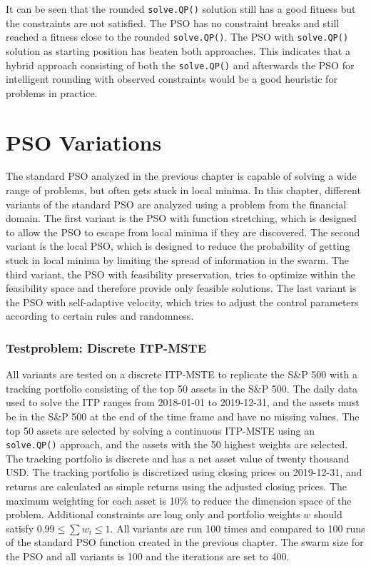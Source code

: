 \documentclass[
  oneside]{book}
\begin{document}
It can be seen that the rounded \texttt{solve.QP()} solution still has a good fitness but the constraints are not satisfied. The PSO has no constraint breaks and still reached a fitness close to the rounded \texttt{solve.QP()}. The PSO with \texttt{solve.QP()} solution as starting position has beaten both approaches. This indicates that a hybrid approach consisting of both the \texttt{solve.QP()} and afterwards the PSO for intelligent rounding with observed constraints would be a good heuristic for problems in practice.

\hypertarget{pso-variations}{%
\chapter{PSO Variations}\label{pso-variations}}

The standard PSO analyzed in the previous chapter is capable of solving a wide range of problems, but often gets stuck in local minima. In this chapter, different variants of the standard PSO are analyzed using a problem from the financial domain. The first variant is the PSO with function stretching, which is designed to allow the PSO to escape from local minima if they are discovered. The second variant is the local PSO, which is designed to reduce the probability of getting stuck in local minima by limiting the spread of information in the swarm. The third variant, the PSO with feasibility preservation, tries to optimize within the feasibility space and therefore provide only feasible solutions. The last variant is the PSO with self-adaptive velocity, which tries to adjust the control parameters according to certain rules and randomness.

\hypertarget{testproblem-discrete-itp-mste}{%
\subsection{Testproblem: Discrete ITP-MSTE}\label{testproblem-discrete-itp-mste}}

All variants are tested on a discrete ITP-MSTE to replicate the S\&P 500 with a tracking portfolio consisting of the top 50 assets in the S\&P 500. The daily data used to solve the ITP ranges from 2018-01-01 to 2019-12-31, and the assets must be in the S\&P 500 at the end of the time frame and have no missing values. The top 50 assets are selected by solving a continuous ITP-MSTE using an \texttt{solve.QP()} approach, and the assets with the 50 highest weights are selected. The tracking portfolio is discrete and has a net asset value of twenty thousand USD. The tracking portfolio is discretized using closing prices on 2019-12-31, and returns are calculated as simple returns using the adjusted closing prices. The maximum weighting for each asset is 10\% to reduce the dimension space of the problem. Additional constraints are long only and portfolio weights \(w\) should satisfy \(0.99 \leq \textstyle\sum w_i \leq 1\). All variants are run 100 times and compared to 100 runs of the standard PSO function created in the previous chapter. The swarm size for the PSO and all variants is 100 and the iterations are set to 400.
\end{document}
